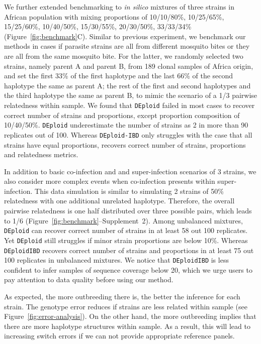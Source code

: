 \documentclass[9pt]{article}
\begin{document}
We further extended benchmarking to \emph{in silico} mixtures of three strains in African population with mixing proportions of 10/10/80\%, 10/25/65\%, 15/25/60\%, 10/40/50\%,
15/30/55\%, 20/30/50\%, 33/33/34\% (Figure~\ref{fig:benchmark}C). Similar to previous experiment, we benchmark our methods in cases if parasite strains are all from different mosquito bites or they are all from the same mosquito bite. For the latter, we randomly selected two strains, namely parent A and parent B, from 189 clonal samples of Africa origin, and set the first 33\% of the first haplotype and the last 66\% of the second haplotype the same as parent A; the rest of the first and second haplotypes and the third haplotype the same as parent B, to mimic the scenario of a 1/3 pairwise relatedness within sample. We found that {\tt DEploid} failed in most cases to recover correct number of strains and proportions, except proportion composition of 10/40/50\%. {\tt DEploid} underestimate the number of strains as 2 in more than 90 replicates out of 100. Whereas {\tt DEploid-IBD} only struggles with the case that all strains have equal proportions, recovers correct number of strains, proportions and relatedness metrics.

In addition to basic co-infection and and super-infection scenarios of 3 strains, we also consider more complex events when co-infection presents within super-infection. This data simulation is similar to simulating 2 strains of 50\% relatedness with one additional unrelated haplotype. Therefore, the overall pairwise relatedness is one half distributed over three possible pairs, which leads to 1/6 (Figure~\ref{fig:benchmark}--Supplement~2). Among unbalanced mixtures, {\tt DEploid} can recover correct number of strains in at least 58 out 100 replicates. Yet {\tt DEploid} still struggles if minor strain proportions are below 10\%. Whereas {\tt DEploidIBD} recovers correct number of strains and proportions in at least 75 out 100 replicates in unbalanced mixtures. We notice that {\tt DEploidIBD} is less confident to infer samples of sequence coverage below 20, which we urge users to pay attention to data quality before using our method.

As expected, the more outbreeding there is, the better the inference for each strain. The genotype error reduces if strains are less related within sample (see Figure~\ref{fig:error-analysis}). On the other hand, the more outbreeding implies that there are more haplotype structures within sample. As a result, this will lead to increasing switch errors if we can not provide appropriate reference panels.
\end{document}

